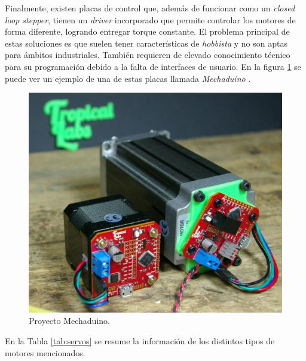 Finalmente, existen placas de control que, además de funcionar como un \textit{closed loop stepper}, tienen un \textit{driver} incorporado que permite controlar los motores de forma diferente, logrando entregar torque constante. El problema principal de estas soluciones es que suelen tener características de \textit{hobbista} y no son aptas para ámbitos industriales. También requieren de elevado conocimiento técnico para su programación debido a la falta de interfaces de usuario. En la figura \ref{fig:mechaduino} se puede ver un ejemplo de una de estas placas llamada \textit{Mechaduino} \citep{web_mechaduino}.

\begin{figure}[h!]
	\centering
	\includegraphics[scale=.6]{./Figures/mechaduino.jpg}
	\caption{Proyecto Mechaduino\protect\footnotemark .}
	\label{fig:mechaduino}
\end{figure}


En la Tabla \ref{tab:servos} se resume la información de los distintos tipos de motores mencionados.


